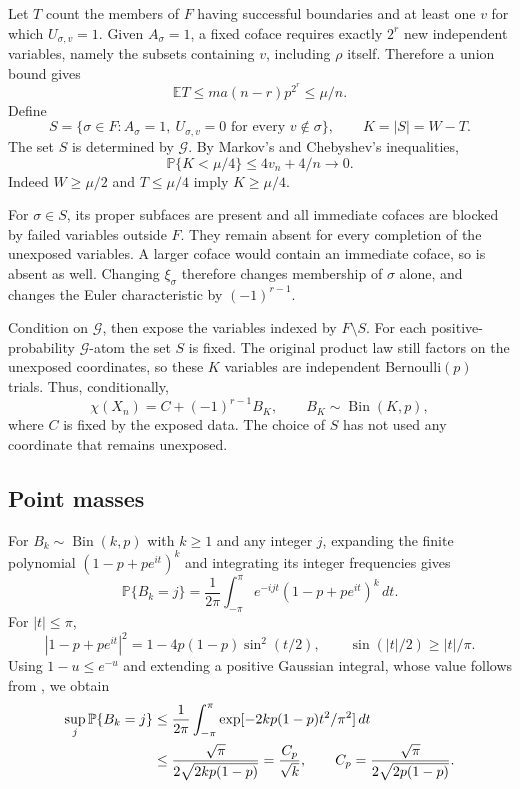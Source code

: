 \documentclass[11pt,a4paper]{article}
\newcommand{\E}{\mathbb E}
\newcommand{\Prob}{\mathbb P}
\begin{document}
Let $T$ count the members of $F$ having successful boundaries and at least
one $v$ for which $U_{\sigma,v}=1$. Given $A_\sigma=1$, a fixed coface
requires exactly $2^r$ new independent variables, namely the subsets
containing $v$, including $\rho$ itself. Therefore a union bound gives
\begin{equation}\label{eq:cofaces}
\E T\le ma(n-r)p^{2^r}\le\mu/n.
\end{equation}
Define
\[
S=\{\sigma\in F:A_\sigma=1,\ U_{\sigma,v}=0
       \text{ for every }v\notin\sigma\},\qquad K=|S|=W-T.
\]
The set $S$ is determined by $\mathcal G$. By Markov's and Chebyshev's
inequalities,
\begin{equation}\label{eq:safe}
\Prob\{K<\mu/4\}\le4v_n+4/n\longrightarrow0.
\end{equation}
Indeed $W\ge\mu/2$ and $T\le\mu/4$ imply $K\ge\mu/4$.

For $\sigma\in S$, its proper subfaces are present and all immediate
cofaces are blocked by failed variables outside $F$. They remain absent
for every completion of the unexposed variables. A larger coface would
contain an immediate coface, so is absent as well. Changing
$\xi_\sigma$ therefore changes membership of $\sigma$ alone, and
changes the Euler characteristic by $(-1)^{r-1}$.

Condition on $\mathcal G$, then expose the variables indexed by $F\setminus S$.
For each positive-probability $\mathcal G$-atom the set $S$ is fixed.
The original product law still factors on the unexposed coordinates,
so these $K$ variables are independent Bernoulli$(p)$ trials. Thus,
conditionally,
\begin{equation}\label{eq:binomial}
\chi(X_n)=C+(-1)^{r-1}B_K,\qquad B_K\sim\operatorname{Bin}(K,p),
\end{equation}
where $C$ is fixed by the exposed data. The choice of $S$ has not used
any coordinate that remains unexposed.

\subsection{Point masses}

For $B_k\sim\operatorname{Bin}(k,p)$ with $k\ge1$ and any integer $j$, expanding the finite
polynomial $(1-p+pe^{it})^k$ and integrating its integer frequencies gives
\[
\Prob\{B_k=j\}
=\frac1{2\pi}\int_{-\pi}^{\pi}
 e^{-ijt}(1-p+pe^{it})^k\,dt .
\]
For $|t|\le\pi$,
\[
|1-p+pe^{it}|^2=1-4p(1-p)\sin^2(t/2),\qquad
\sin(|t|/2)\ge|t|/\pi.
\]
Using $1-u\le e^{-u}$ and extending a positive Gaussian integral,
whose value follows from \cite[\S7.2(i)]{DLMF}, we obtain
\begin{align}
\sup_j\Prob\{B_k=j\}
&\le\frac1{2\pi}\int_{-\pi}^{\pi}
 \exp[-2kp(1-p)t^2/\pi^2]\,dt \notag\\
&\le\frac{\sqrt\pi}{2\sqrt{2kp(1-p)}}
=\frac{C_p}{\sqrt k},
\qquad C_p=\frac{\sqrt\pi}{2\sqrt{2p(1-p)}}.
\label{eq:binbound}
\end{align}
\end{document}
